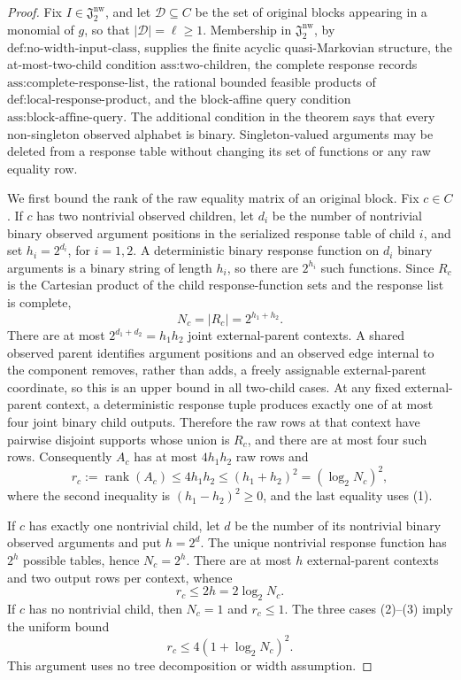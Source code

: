 \documentclass{article}
\begin{document}
\begin{proof}
Fix \(I\in\mathfrak J_2^{\mathrm{nw}}\), and let \(\mathcal D\subseteq C\) be the set of original blocks appearing in a monomial of \(g\), so that \(|\mathcal D|=\ell\ge 1\).  Membership in \(\mathfrak J_2^{\mathrm{nw}}\), by \(\text{def:no-width-input-class}\), supplies the finite acyclic quasi-Markovian structure, the at-most-two-child condition \(\text{ass:two-children}\), the complete response records \(\text{ass:complete-response-list}\), the rational bounded feasible products of \(\text{def:local-response-product}\), and the block-affine query condition \(\text{ass:block-affine-query}\).  The additional condition in the theorem says that every non-singleton observed alphabet is binary.  Singleton-valued arguments may be deleted from a response table without changing its set of functions or any raw equality row.

We first bound the rank of the raw equality matrix of an original block.  Fix \(c\in C\).  If \(c\) has two nontrivial observed children, let \(d_i\) be the number of nontrivial binary observed argument positions in the serialized response table of child \(i\), and set \(h_i=2^{d_i}\), for \(i=1,2\).  A deterministic binary response function on \(d_i\) binary arguments is a binary string of length \(h_i\), so there are \(2^{h_i}\) such functions.  Since \(R_c\) is the Cartesian product of the child response-function sets and the response list is complete,
\[
 N_c=|R_c|=2^{h_1+h_2}.
 \tag{1}
\]
There are at most \(2^{d_1+d_2}=h_1h_2\) joint external-parent contexts.  A shared observed parent identifies argument positions and an observed edge internal to the component removes, rather than adds, a freely assignable external-parent coordinate, so this is an upper bound in all two-child cases.  At any fixed external-parent context, a deterministic response tuple produces exactly one of at most four joint binary child outputs.  Therefore the raw rows at that context have pairwise disjoint supports whose union is \(R_c\), and there are at most four such rows.  Consequently \(A_c\) has at most \(4h_1h_2\) raw rows and
\[
 r_c:=\operatorname{rank}(A_c)
 \le 4h_1h_2
 \le (h_1+h_2)^2
 = (\log_2 N_c)^2,
 \tag{2}
\]
where the second inequality is \((h_1-h_2)^2\ge0\), and the last equality uses (1).

If \(c\) has exactly one nontrivial child, let \(d\) be the number of its nontrivial binary observed arguments and put \(h=2^d\).  The unique nontrivial response function has \(2^h\) possible tables, hence \(N_c=2^h\).  There are at most \(h\) external-parent contexts and two output rows per context, whence
\[
 r_c\le 2h=2\log_2 N_c.
 \tag{3}
\]
If \(c\) has no nontrivial child, then \(N_c=1\) and \(r_c\le1\).  The three cases (2)--(3) imply the uniform bound
\[
 r_c\le4(1+\log_2N_c)^2.
 \tag{4}
\]
This argument uses no tree decomposition or width assumption.


\end{proof}
\end{document}
